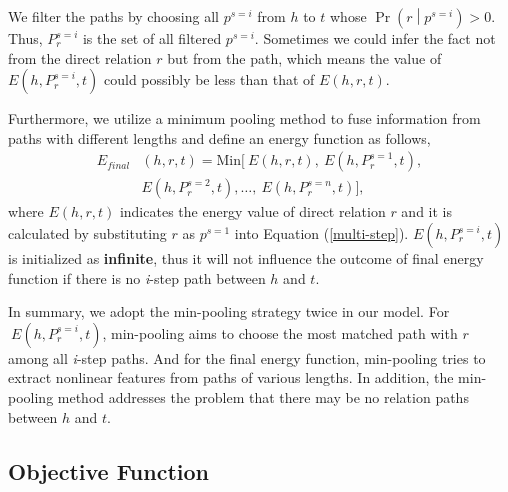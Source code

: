 \documentclass[11pt,a4paper]{article}
\begin{document}
We filter the paths by choosing all \(p^{s = i}\) from $h$ to $t$ whose
\(\Pr\left( r \middle| p^{s = i} \right)
> 0 \). Thus, \(P^{s = i}_{r}\) is the set of all filtered \(p^{s =
i}\). Sometimes we could infer the fact not from the direct relation
${r}$ but from the path, which means the value of \(E\left( h,P^{s =
i}_{r},t \right)\) could possibly be less than that of \(E\left(
h,r,t \right)\).

Furthermore, we utilize a minimum pooling method to fuse information
from paths with different lengths and define an energy function as
follows,
\begin{equation}
\begin{split}
E_{final} & \left( h,r,t \right) = \textrm{Min} \lbrack\ E\left( h,r,t \right),\ E\left( h,P^{s = 1}_{r},t \right), \\
& E\left( h,P^{s = 2}_{r},t \right),\ldots,\ E\left( h,P^{s = n}_{r},t
\right)\rbrack, 
\label{efinal}
\end{split}
\end{equation}
where \(E\left( h,r,t \right)\) indicates the energy value of direct
relation ${r}$ and it is calculated by substituting $r$ as $p^{s=1}$
into Equation (\ref{multi-step}). \(E\left( h,P^{s = i}_{r},t \right)\)
is initialized as \textbf{infinite}, thus it will not influence the
outcome of final energy function if there is no \emph{i}-step path
between ${h}$ and ${t}$.

In summary, we adopt the min-pooling strategy twice in our model.
For\(\ E\left( h,P^{s = i}_{r},t \right)\), min-pooling aims to choose
the most matched path with ${r}$ among all \emph{i}-step paths. And
for the final energy function, min-pooling tries to extract
nonlinear features from paths of various lengths. In addition, the
min-pooling method addresses the problem that there may be no
relation paths between ${h}$ and ${t}$.

\subsection{Objective Function}
\end{document}
